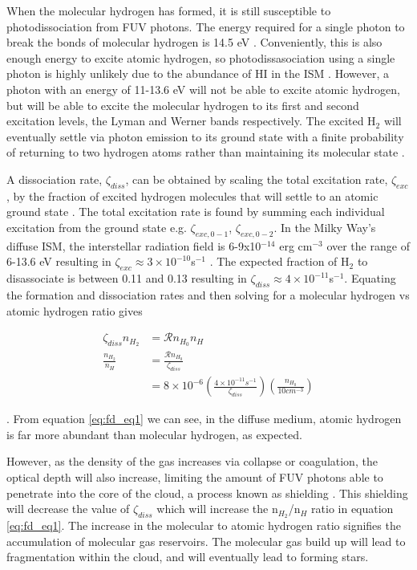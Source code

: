 When the molecular hydrogen has formed, it is still susceptible to photodissociation from FUV photons.  The energy required for a single photon to break the bonds of molecular hydrogen is 14.5 eV \citep{krumholz2014}.  Conveniently, this is also enough energy to excite atomic hydrogen, so photodissasociation using a single photon is highly unlikely due to the abundance of HI in the ISM \citep{krumholz2014}.  However, a photon with an energy of 11-13.6 eV will not be able to excite atomic hydrogen, but will be able to excite the molecular hydrogen to its first and second excitation levels, the Lyman and Werner bands respectively.  The excited H$_2$ will eventually settle via photon emission to its ground state with a finite probability of returning to two hydrogen atoms rather than maintaining its molecular state \citep{krumholz2014}.

A dissociation rate, $\zeta_{diss}$, can be obtained by scaling the total excitation rate, $\zeta_{exc}$, by the fraction of excited hydrogen molecules that will settle to an atomic ground state \citep{krumholz2014}.  The total excitation rate is found by summing each individual excitation from the ground state e.g. $\zeta_{exc,0-1}$, $\zeta_{exc,0-2}$.  In the Milky Way's diffuse ISM, the interstellar radiation field is 6-9x10$^{-14}$ erg cm$^{-3}$ over the range of 6-13.6 eV resulting in $\zeta_{exc} \approx 3\times10^{-10}$s$^{-1}$ \citep{draine2011}.  The expected fraction of H$_2$ to disassociate is between 0.11 and 0.13 resulting in $\zeta_{diss}\approx4\times10^{-11}$s$^{-1}$\citep{draine2011}.
Equating the formation and dissociation rates and then solving for a molecular hydrogen vs atomic hydrogen ratio gives

\begin{equation}\label{eq:fd_eq1}
  \begin{split}
    \zeta_{diss} n_{H_2} & = \mathcal{R}n_{H_0}n_H \\
    \frac{n_{H_2}}{n_H} & = \frac{\mathcal{R}n_{H_0}}{\zeta_{diss}} \\
                        & = 8\times10^{-6}\left(\frac{4\times10^{-11}s^{-1}}{\zeta_{diss}}\right)\left(\frac{n_{H_0}}{10cm^{-3}}\right)
  \end{split}
\end{equation}

\noindent \citep{krumholz2014}.  From equation \ref{eq:fd_eq1} we can see, in the diffuse medium, atomic hydrogen is far more abundant than molecular hydrogen, as expected.

However, as the density of the gas increases via collapse or coagulation, the optical depth will also increase, limiting the amount of FUV photons able to penetrate into the core of the cloud, a process known as shielding \citep{draine2011}.  This shielding will decrease the value of $\zeta_{diss}$ which will increase the n$_{H_2}$/n$_H$ ratio in equation \ref{eq:fd_eq1}.  The increase in the molecular to atomic hydrogen ratio signifies the accumulation of molecular gas reservoirs.  The molecular gas build up will lead to fragmentation within the cloud, and will eventually lead to forming stars.  

